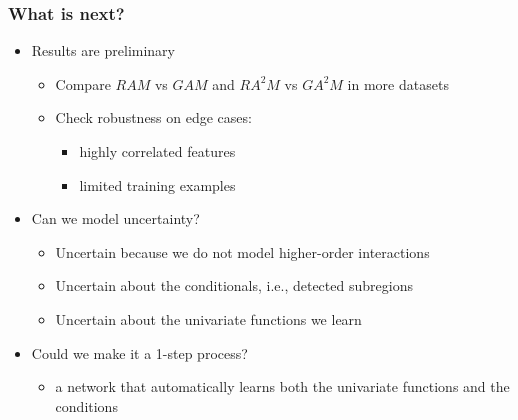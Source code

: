 \documentclass{beamer}
\begin{document}
\begin{frame}
  \frametitle{What is next?}
  \begin{itemize}
  \item Results are preliminary
    \begin{itemize}
      \item Compare $RAM$ vs $GAM$ and $RA^2M$ vs $GA^2M$ in more datasets
      \item Check robustness on edge cases:
        \begin{itemize}
        \item highly correlated features
        \item limited training examples
        \end{itemize}
      \end{itemize}

    \item Can we model uncertainty?
      \begin{itemize}
      \item Uncertain because we do not model higher-order interactions
      \item Uncertain about the conditionals, i.e., detected subregions
      \item Uncertain about the univariate functions we learn
      \end{itemize}

    \item Could we make it a 1-step process?
      \begin{itemize}
        \item a network that automatically learns both the univariate functions and the conditions
      \end{itemize}
  \end{itemize}

  \noindent\makebox[\linewidth]{\rule{\paperwidth}{0.4pt}}

\end{frame}
\end{document}
